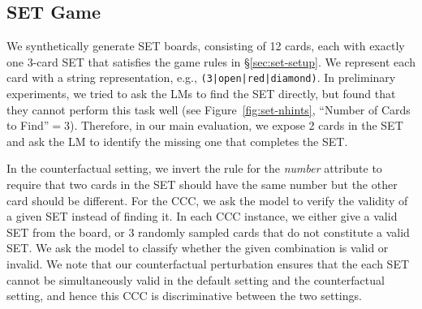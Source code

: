\subsection{SET Game}

We synthetically generate SET boards, consisting of 12 cards, each with exactly one 3-card SET that satisfies the game rules in \S\ref{sec:set-setup}. 
We represent each card with a string representation, e.g., \texttt{(3|open|red|diamond)}. 
In preliminary experiments, we tried to ask the LMs to find the SET directly, but found that they cannot perform this task well (see Figure~\ref{fig:set-nhints}, ``Number of Cards to Find''$=3$).
Therefore, in our main evaluation, we expose 2 cards in the SET and ask the LM to identify the missing one that completes the SET.

In the counterfactual setting, we invert the rule for the \emph{number} attribute to require that two cards in the SET should have the same number but the other card should be different.
For the CCC, we ask the model to verify the validity of a given SET instead of finding it. In each CCC instance, we either give a valid SET from the board, or 3 randomly sampled cards that do not constitute a valid SET. We ask the model to classify whether the given combination is valid or invalid. We note that our counterfactual perturbation ensures that the each SET cannot be simultaneously valid in the default setting and the counterfactual setting, and hence this CCC is discriminative between the two settings.
